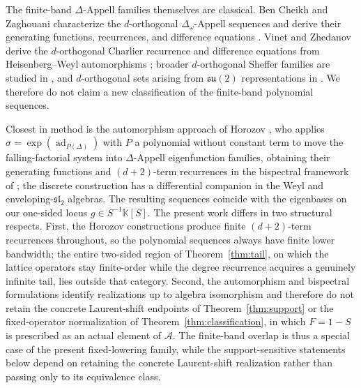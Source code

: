 \documentclass[11pt,reqno]{amsart}
\numberwithin{equation}{section}
\theoremstyle{definition}
\theoremstyle{remark}
\newcommand{\K}{\mathbb K}
\newcommand{\algA}{\mathcal A}
\newcommand{\ad}{\operatorname{ad}}
\begin{document}
The finite-band $\Delta$-Appell families themselves are classical.  Ben Cheikh and Zaghouani characterize the $d$-orthogonal $\Delta_\omega$-Appell sequences and derive their generating functions, recurrences, and difference equations \cite[Theorems~1.1, 2.1, and 2.2]{BenCheikhZaghouani2003}.  Vinet and Zhedanov derive the $d$-orthogonal Charlier recurrence and difference equations from Heisenberg--Weyl automorphisms \cite[Theorem~1]{VinetZhedanov2009}; broader $d$-orthogonal Sheffer families are studied in \cite{ChaggaraMbarki2018}, and $d$-orthogonal sets arising from $\mathfrak{su}(2)$ representations in \cite{GenestVinetZhedanov2012}.  We therefore do not claim a new classification of the finite-band polynomial sequences.

Closest in method is the automorphism approach of Horozov \cite{Horozov2016,Horozov2016cont}, who applies $\sigma=\exp(\ad_{P(\Delta)})$ with $P$ a polynomial without constant term to move the falling-factorial system into $\Delta$-Appell eigenfunction families, obtaining their generating functions and $(d+2)$-term recurrences in the bispectral framework of \cite{VinetZhedanov2009}; the discrete construction \cite{Horozov2016} has a differential companion \cite{Horozov2016cont} in the Weyl and enveloping-$\mathfrak{sl}_2$ algebras.  The resulting sequences coincide with the eigenbases on our one-sided locus $g\in S^{-1}\K[S]$.  The present work differs in two structural respects.  First, the Horozov constructions produce finite $(d+2)$-term recurrences throughout, so the polynomial sequences always have finite lower bandwidth; the entire two-sided region of Theorem~\ref{thm:tail}, on which the lattice operators stay finite-order while the degree recurrence acquires a genuinely infinite tail, lies outside that category.  Second, the automorphism and bispectral formulations identify realizations up to algebra isomorphism and therefore do not retain the concrete Laurent-shift endpoints of Theorem~\ref{thm:support} or the fixed-operator normalization of Theorem~\ref{thm:classification}, in which $F=1-S$ is prescribed as an actual element of $\algA$. The finite-band overlap is thus a special case of the present fixed-lowering family, while the support-sensitive statements below depend on retaining the concrete Laurent-shift realization rather than passing only to its equivalence class. 
\end{document}
